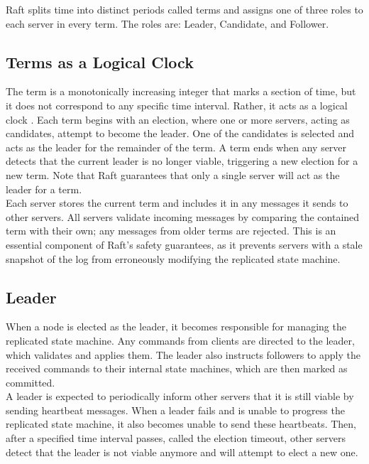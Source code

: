 Raft splits time into distinct periods called terms and assigns one of three roles to each server in every term. The roles are: Leader, Candidate, and Follower.

\subsection{Terms as a Logical Clock}

The term is a monotonically increasing integer that marks a section of time, but it does not correspond to any specific time interval. Rather, it acts as a logical clock \cite{logical-clocks}. Each term begins with an election, where one or more servers, acting as candidates, attempt to become the leader. One of the candidates is selected and acts as the leader for the remainder of the term. A term ends when any server detects that the current leader is no longer viable, triggering a new election for a new term. Note that Raft guarantees that only a single server will act as the leader for a term.\\

Each server stores the current term and includes it in any messages it sends to other servers. All servers validate incoming messages by comparing the contained term with their own; any messages from older terms are rejected. This is an essential component of Raft's safety guarantees, as it prevents servers with a stale snapshot of the log from erroneously modifying the replicated state machine.\\

\subsection{Leader}

When a node is elected as the leader, it becomes responsible for managing the replicated state machine. Any commands from clients are directed to the leader, which validates and applies them. The leader also instructs followers to apply the received commands to their internal state machines, which are then marked as committed.\\

A leader is expected to periodically inform other servers that it is still viable by sending heartbeat messages. When a leader fails and is unable to progress the replicated state machine, it also becomes unable to send these heartbeats. Then, after a specified time interval passes, called the election timeout, other servers detect that the leader is not viable anymore and will attempt to elect a new one.\\

